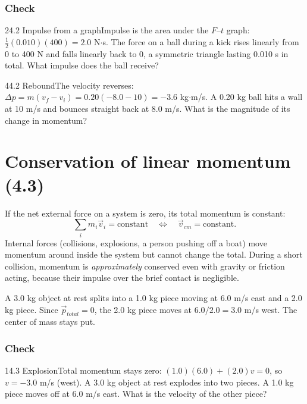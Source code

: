 \documentclass[11pt]{article}
\begin{document}
\subsubsection{Check}\mbox{}

\begin{q}{2}{4.2 Impulse from a graph}{Impulse is the area under the $F$--$t$ graph: $\tfrac12(0.010)(400) = 2.0$ N$\cdot$s.}
The force on a ball during a kick rises linearly from 0 to 400 N and falls linearly back to 0, a symmetric triangle lasting 0.010 s in total. What impulse does the ball receive?
\end{q}
\begin{q}{4}{4.2 Rebound}{The velocity reverses: $\Delta p = m(v_f - v_i) = 0.20(-8.0 - 10) = -3.6$ kg$\cdot$m/s.}
A 0.20 kg ball hits a wall at 10 m/s and bounces straight back at 8.0 m/s. What is the magnitude of its change in momentum?
\end{q}

\section{Conservation of linear momentum (4.3)}\label{sec:2}

If the net external force on a system is zero, its total momentum is constant:
\[ \sum_i m_i\vec v_i = \text{constant} \quad\Longleftrightarrow\quad \vec v_{cm} = \text{constant}. \]
Internal forces (collisions, explosions, a person pushing off a boat) move momentum around inside the system but cannot change the total. During a short collision, momentum is \emph{approximately} conserved even with gravity or friction acting, because their impulse over the brief contact is negligible.

\begin{example}
A 3.0 kg object at rest splits into a 1.0 kg piece moving at 6.0 m/s east and a 2.0 kg piece. Since $\vec p_{total} = 0$, the 2.0 kg piece moves at $6.0/2.0 = 3.0$ m/s west. The center of mass stays put.
\end{example}

\subsubsection{Check}\mbox{}

\begin{q}{1}{4.3 Explosion}{Total momentum stays zero: $(1.0)(6.0) + (2.0)v = 0$, so $v = -3.0$ m/s (west).}
A 3.0 kg object at rest explodes into two pieces. A 1.0 kg piece moves off at 6.0 m/s east. What is the velocity of the other piece?
\end{q}
\end{document}
